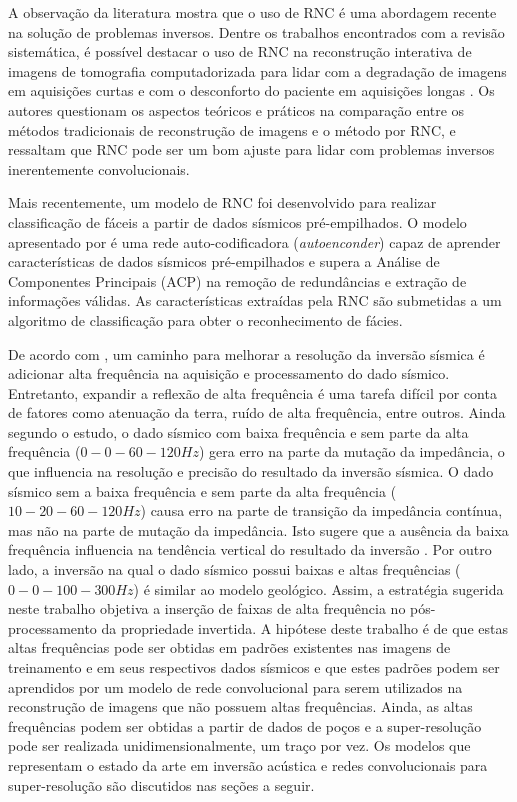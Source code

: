 A observação da literatura mostra que o uso de RNC é uma abordagem recente na solução de problemas inversos.
Dentre os trabalhos encontrados com a revisão sistemática, é possível destacar
o uso de RNC na reconstrução interativa de imagens de tomografia computadorizada para lidar
com a degradação de imagens em aquisições curtas e com o desconforto do paciente em aquisições longas \citep{Hwan16}. 
Os autores questionam os aspectos teóricos e práticos na comparação entre os métodos tradicionais de
reconstrução de imagens e o método por RNC, e ressaltam que RNC pode ser um bom ajuste para lidar com
problemas inversos inerentemente convolucionais.

Mais recentemente, um modelo de RNC foi desenvolvido para realizar classificação de fáceis a partir de dados
sísmicos pré-empilhados. O modelo apresentado por \cite{Qian17} é uma rede auto-codificadora (\textit{autoenconder})
capaz de aprender características de dados sísmicos pré-empilhados e supera a Análise de Componentes Principais (ACP)
na remoção de redundâncias e extração de informações válidas. As características extraídas pela RNC são submetidas a um algoritmo
de classificação para obter o reconhecimento de fácies.

De acordo com \cite{Xiaoyu2012}, um caminho
para melhorar a resolução da inversão sísmica é adicionar alta frequência
na aquisição e processamento do dado sísmico. Entretanto, expandir a reflexão de alta frequência é uma tarefa
difícil por conta de fatores como atenuação da terra, ruído de alta frequência, 
entre outros. Ainda segundo o estudo, o dado sísmico com baixa frequência e
sem parte da alta frequência ($0 - 0 - 60 - 120Hz$) gera erro na parte da mutação da impedância, o que
influencia na resolução e precisão do resultado da inversão sísmica. O dado sísmico
sem a baixa frequência e sem parte da alta frequência ($10 - 20 - 60 - 120Hz$) causa erro na parte de transição da impedância
contínua, mas não na parte de mutação da impedância. Isto sugere que a ausência da baixa frequência influencia
na tendência vertical do resultado da inversão \citep{Xiaoyu2012}. Por outro lado, a inversão na qual o dado sísmico possui baixas e
altas frequências ($0 - 0 - 100 - 300Hz$) é similar ao modelo geológico.
Assim, a estratégia sugerida neste trabalho objetiva a inserção de faixas de alta frequência no pós-processamento da propriedade invertida.
A hipótese deste trabalho é de que estas altas frequências pode ser obtidas em padrões existentes nas imagens de treinamento
e em seus respectivos dados sísmicos e que estes padrões podem ser aprendidos por um modelo de rede convolucional
para serem utilizados na reconstrução de imagens que não possuem altas frequências. Ainda, as altas frequências podem ser obtidas
a partir de dados de poços e a super-resolução pode ser realizada unidimensionalmente, um traço por vez.
Os modelos que representam o estado da arte em inversão
acústica e redes convolucionais para super-resolução são discutidos nas seções a seguir.

